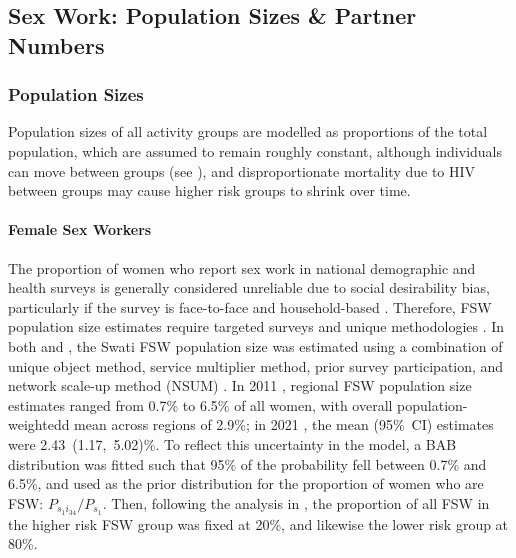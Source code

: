 \subsection{Sex Work: Population Sizes \& Partner Numbers}\label{model.par.sw}
\subsubsection{Population Sizes}\label{model.par.sw.size}
Population sizes of all activity groups are modelled as proportions of the total population,
which are assumed to remain roughly constant,
although individuals can move between groups (see ),
and disproportionate mortality due to HIV between groups
may cause higher risk groups to shrink over time.
\paragraph{Female Sex Workers}
The proportion of women who report sex work in national demographic and health surveys
is generally considered unreliable due to social desirability bias,
particularly if the survey is face-to-face and household-based
\cite{Konings1995,Gregson2002,Gregson2004,Lowndes2012,Behanzin2013}.
Therefore, FSW population size estimates require
targeted surveys and unique methodologies \cite{UNAIDS2010size,Abdul-Quader2014}.
In both \cite{EswKP2014} and \cite{EswIBBS2022}, the Swati FSW population size
was estimated using a combination of
unique object method, service multiplier method, prior survey participation,
and network scale-up method (NSUM) \cite{UNAIDS2010size}.
In 2011 \cite{EswKP2014}, regional FSW population size estimates
ranged from 0.7\% to 6.5\% of all women,
with overall population-weightedd mean across regions of 2.9\%;
in 2021 \cite{EswIBBS2022}, the mean (95\%~CI) estimates were 2.43~(1.17,~5.02)\%.
To reflect this uncertainty in the model, a BAB distribution was fitted
such that 95\% of the probability fell between 0.7\% and 6.5\%,
and used as the prior distribution for the proportion of women who are FSW:
$P_{s_{1}i_{34}} / P_{s_{1}}$.
Then, following the analysis in ,
the proportion of all FSW in the higher risk FSW group was fixed at 20\%,
and likewise the lower risk group at 80\%.
